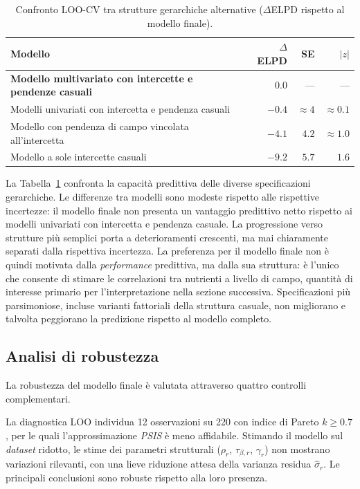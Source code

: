 \documentclass[11pt, a4paper]{article}
\newcommand{\tauB}[1]{\tau_{\beta,#1}}
\begin{document}
\begin{table}[htbp]
\centering
\caption{Confronto LOO-CV tra strutture gerarchiche alternative ($\Delta$ELPD rispetto al modello finale).}
\label{tab:loo4}
\small
\begin{tabular}{@{}p{10.5cm}rrr@{}}
\toprule
Modello & $\Delta$ELPD & SE & $|z|$ \\
\midrule

\textbf{Modello multivariato con intercette e pendenze casuali}
& $\mathbf{0.0}$
& ---
& --- \\

Modelli univariati con intercetta e pendenza casuali
& $-0.4$
& $\approx 4$
& $\approx 0.1$ \\

Modello con pendenza di campo vincolata all'intercetta
& $-4.1$
& $4.2$
& $\approx 1.0$ \\

Modello a sole intercette casuali
& $-9.2$
& $5.7$
& $1.6$ \\

\bottomrule
\end{tabular}
\end{table}

La Tabella~\ref{tab:loo4} confronta la capacità predittiva delle diverse specificazioni gerarchiche. Le differenze tra modelli sono modeste rispetto alle rispettive incertezze: il modello finale non presenta un vantaggio predittivo netto rispetto ai modelli univariati con intercetta e pendenza casuale. La progressione verso strutture più semplici porta a deterioramenti crescenti, ma mai chiaramente separati dalla rispettiva incertezza. La preferenza per il modello finale non è quindi motivata dalla \textit{performance} predittiva, ma dalla sua struttura: è l'unico che consente di stimare le correlazioni tra nutrienti a livello di campo, quantità di interesse primario per l'interpretazione nella sezione successiva. Specificazioni più parsimoniose, incluse varianti fattoriali della struttura casuale, non migliorano e talvolta peggiorano la predizione rispetto al modello completo.

\subsection{Analisi di robustezza}
\label{subsec:robustezza}

La robustezza del modello finale è valutata attraverso quattro controlli complementari.

La diagnostica LOO individua 12 osservazioni su 220 con indice di Pareto $k \geq 0.7$, per le quali l'approssimazione \textit{PSIS} è meno affidabile. Stimando il modello sul \textit{dataset} ridotto, le stime dei parametri strutturali ($\rho_r$, $\tauB{r}$, $\gamma_r$) non mostrano variazioni rilevanti, con una lieve riduzione attesa della varianza residua $\hat{\sigma}_r$. Le principali conclusioni sono robuste rispetto alla loro presenza.
\end{document}
